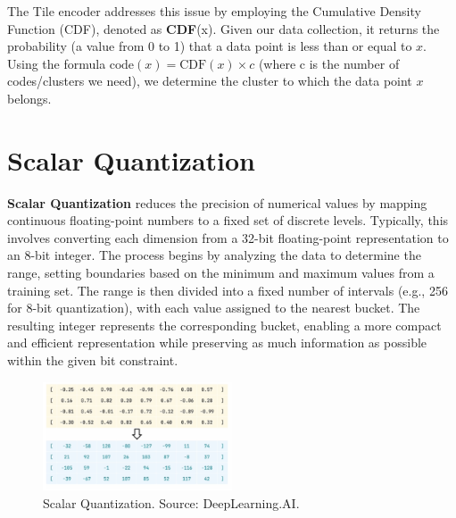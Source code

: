 The Tile encoder addresses this issue by employing the Cumulative Density Function (CDF), denoted as \textbf{CDF}(x). Given our data collection, it returns the probability (a value from 0 to 1) that a data point is less than or equal to \(x\). Using the formula \(\text{code}(x) = \text{CDF}(x) \times c\) (where c is the number of codes/clusters we need), we determine the cluster to which the data point \(x\) belongs. 


\section{Scalar Quantization}
\textbf{Scalar Quantization} reduces the precision of numerical values by mapping continuous floating-point numbers to a fixed set of discrete levels. Typically, this involves converting each dimension from a 32-bit floating-point representation to an 8-bit integer. The process begins by analyzing the data to determine the range, setting boundaries based on the minimum and maximum values from a training set. The range is then divided into a fixed number of intervals (e.g., 256 for 8-bit quantization), with each value assigned to the nearest bucket. The resulting integer represents the corresponding bucket, enabling a more compact and efficient representation while preserving as much information as possible within the given bit constraint.
\begin{figure}[h]
    \centering
    \includegraphics[width=0.5\textwidth]{IMAGES/immagine_2025-02-27_123316646.png}
    \caption{Scalar Quantization. Source: DeepLearning.AI.\footnotemark[1]}
    \label{fig:SQ}
\end{figure}

